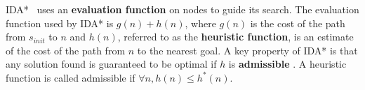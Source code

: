 \documentclass[letterpaper]{article}
\begin{document}
IDA*~\cite{korf85} uses an \textbf{evaluation function} on nodes to guide its search. The evaluation function used by IDA* is $g(n) + h(n)$, where $g(n)$ is the cost of the path from $s_{init}$ to $n$ and $h(n)$, referred to as the \textbf{heuristic function}, is an estimate of the cost of the path from $n$ to the nearest goal.
A key property of IDA* is that any solution found is guaranteed to be optimal if $h$ is \textbf{admissible} \cite{korf85}. A heuristic function is called admissible if $\forall n, h(n) \leq h^*(n)$. 










%
\end{document}
